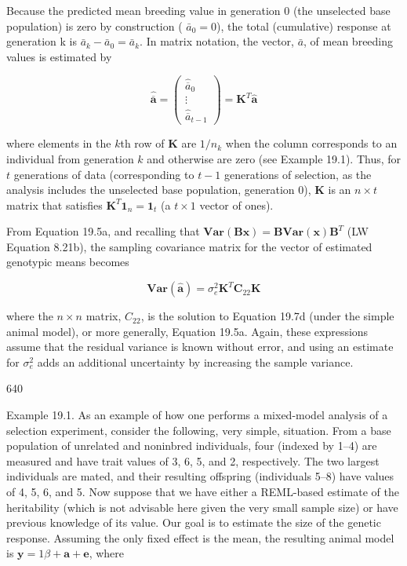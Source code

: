 \documentclass{article}
\begin{document}
Because the predicted mean breeding value in generation 0 (the unselected base population) is zero by construction ( $ \bar{a}_{0}=0 $), the total (cumulative) response at generation k is  $ \bar{a}_{k}-\bar{a}_{0}=\bar{a}_{k} $. In matrix notation, the vector,  $ \bar{a} $, of mean breeding values is estimated by

\begin{equation}
\widehat{\overline{\mathbf{a}}}=\begin{pmatrix}\widehat{\overline{a}}_{0}\\ \vdots\\ \widehat{\overline{a}}_{t-1}\end{pmatrix}=\mathbf{K}^{T}\widehat{\mathbf{a}}
\tag{19.8b}
\label{eq:19_8b}
\end{equation}

where elements in the $k$th row of $\mathbf{K}$ are $1/n_k$ when the column corresponds to an individual from generation $k$ and otherwise are zero (see Example 19.1). Thus, for $t$ generations of data (corresponding to $t-1$ generations of selection, as the analysis includes the unselected base population, generation 0), $\mathbf{K}$ is an $n \times t$ matrix that satisfies $\mathbf{K}^T \mathbf{1}_n = \mathbf{1}_t$ (a $t \times 1$ vector of ones).

From Equation 19.5a, and recalling that  $ \mathbf{Var}(\mathbf{B}\mathbf{x}) = \mathbf{B}\mathbf{Var}(\mathbf{x})\mathbf{B}^{T} $ (LW Equation 8.21b), the sampling covariance matrix for the vector of estimated genotypic means becomes

\begin{equation}
\mathbf{V a r}\left(\widehat{\mathbf{a}}\right)=\sigma_{e}^{2}\mathbf{K}^{T}\mathbf{C}_{22}\mathbf{K}
\tag{19.8c}
\label{eq:19_8c}
\end{equation}

where the  $ n \times n $ matrix,  $ C_{22} $, is the solution to Equation 19.7d (under the simple animal model), or more generally, Equation 19.5a. Again, these expressions assume that the residual variance is known without error, and using an estimate for  $ \sigma_e^2 $ adds an additional uncertainty by increasing the sample variance.

640

Example 19.1. As an example of how one performs a mixed-model analysis of a selection experiment, consider the following, very simple, situation. From a base population of unrelated and noninbred individuals, four (indexed by 1–4) are measured and have trait values of 3, 6, 5, and 2, respectively. The two largest individuals are mated, and their resulting offspring (individuals 5–8) have values of 4, 5, 6, and 5. Now suppose that we have either a REML-based estimate of the heritability (which is not advisable here given the very small sample size) or have previous knowledge of its value. Our goal is to estimate the size of the genetic response. Assuming the only fixed effect is the mean, the resulting animal model is  $ \mathbf{y} = 1\beta + \mathbf{a} + \mathbf{e} $, where
\end{document}
